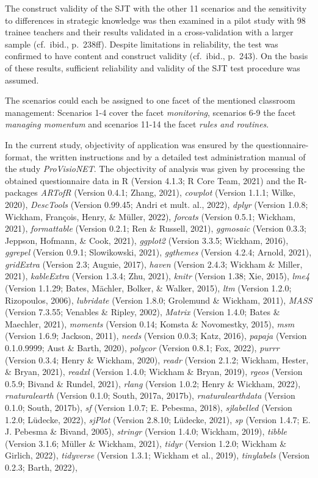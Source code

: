 \documentclass[
  man]{apa6}
\begin{document}
The construct validity of the SJT with the other 11 scenarios and the sensitivity to differences in strategic knowledge was then examined in a pilot study with 98 trainee teachers and their results validated in a cross-validation with a larger sample (cf.~ibid., p.~238ff). Despite limitations in reliability, the test was confirmed to have content and construct validity (cf.~ibid., p.~243). On the basis of these results, sufficient reliability and validity of the SJT test procedure was assumed.

The scenarios could each be assigned to one facet of the mentioned classroom management: Scenarios 1-4 cover the facet \emph{monitoring}, scenarios 6-9 the facet \emph{managing momentum} and scenarios 11-14 the facet \emph{rules and routines}.

In the current study, objectivity of application was ensured by the questionnaire-format, the written instructions and by a detailed test administration manual of the study \emph{ProVisioNET}. The objectivity of analysis was given by processing the obtained questionnaire data in R (Version 4.1.3; R Core Team, 2021) and the R-packages \emph{ARTofR} (Version 0.4.1; Zhang, 2021), \emph{cowplot} (Version 1.1.1; Wilke, 2020), \emph{DescTools} (Version 0.99.45; Andri et mult. al., 2022), \emph{dplyr} (Version 1.0.8; Wickham, François, Henry, \& Müller, 2022), \emph{forcats} (Version 0.5.1; Wickham, 2021), \emph{formattable} (Version 0.2.1; Ren \& Russell, 2021), \emph{ggmosaic} (Version 0.3.3; Jeppson, Hofmann, \& Cook, 2021), \emph{ggplot2} (Version 3.3.5; Wickham, 2016), \emph{ggrepel} (Version 0.9.1; Slowikowski, 2021), \emph{ggthemes} (Version 4.2.4; Arnold, 2021), \emph{gridExtra} (Version 2.3; Auguie, 2017), \emph{haven} (Version 2.4.3; Wickham \& Miller, 2021), \emph{kableExtra} (Version 1.3.4; Zhu, 2021), \emph{knitr} (Version 1.38; Xie, 2015), \emph{lme4} (Version 1.1.29; Bates, Mächler, Bolker, \& Walker, 2015), \emph{ltm} (Version 1.2.0; Rizopoulos, 2006), \emph{lubridate} (Version 1.8.0; Grolemund \& Wickham, 2011), \emph{MASS} (Version 7.3.55; Venables \& Ripley, 2002), \emph{Matrix} (Version 1.4.0; Bates \& Maechler, 2021), \emph{moments} (Version 0.14; Komsta \& Novomestky, 2015), \emph{msm} (Version 1.6.9; Jackson, 2011), \emph{needs} (Version 0.0.3; Katz, 2016), \emph{papaja} (Version 0.1.0.9999; Aust \& Barth, 2020), \emph{polycor} (Version 0.8.1; Fox, 2022), \emph{purrr} (Version 0.3.4; Henry \& Wickham, 2020), \emph{readr} (Version 2.1.2; Wickham, Hester, \& Bryan, 2021), \emph{readxl} (Version 1.4.0; Wickham \& Bryan, 2019), \emph{rgeos} (Version 0.5.9; Bivand \& Rundel, 2021), \emph{rlang} (Version 1.0.2; Henry \& Wickham, 2022), \emph{rnaturalearth} (Version 0.1.0; South, 2017a, 2017b), \emph{rnaturalearthdata} (Version 0.1.0; South, 2017b), \emph{sf} (Version 1.0.7; E. Pebesma, 2018), \emph{sjlabelled} (Version 1.2.0; Lüdecke, 2022), \emph{sjPlot} (Version 2.8.10; Lüdecke, 2021), \emph{sp} (Version 1.4.7; E. J. Pebesma \& Bivand, 2005), \emph{stringr} (Version 1.4.0; Wickham, 2019), \emph{tibble} (Version 3.1.6; Müller \& Wickham, 2021), \emph{tidyr} (Version 1.2.0; Wickham \& Girlich, 2022), \emph{tidyverse} (Version 1.3.1; Wickham et al., 2019), \emph{tinylabels} (Version 0.2.3; Barth, 2022), 
\end{document}

